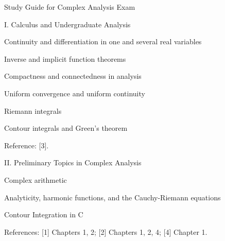 \documentclass[a4paper,portrait,12pt]{article}
\begin{document}
\begin{flushleft}
Study Guide for Complex Analysis Exam
\end{flushleft}


\begin{flushleft}
I. Calculus and Undergraduate Analysis
\end{flushleft}


\begin{flushleft}
Continuity and differentiation in one and several real variables
\end{flushleft}


\begin{flushleft}
Inverse and implicit function theorems
\end{flushleft}


\begin{flushleft}
Compactness and connectedness in analysis
\end{flushleft}


\begin{flushleft}
Uniform convergence and uniform continuity
\end{flushleft}


\begin{flushleft}
Riemann integrals
\end{flushleft}


\begin{flushleft}
Contour integrals and Green's theorem
\end{flushleft}


\begin{flushleft}
Reference: [3].
\end{flushleft}


\begin{flushleft}
II. Preliminary Topics in Complex Analysis
\end{flushleft}


\begin{flushleft}
Complex arithmetic
\end{flushleft}


\begin{flushleft}
Analyticity, harmonic functions, and the Cauchy-Riemann equations
\end{flushleft}


\begin{flushleft}
Contour Integration in C
\end{flushleft}


\begin{flushleft}
References: [1] Chapters 1, 2; [2] Chapters 1, 2, 4; [4] Chapter 1.
\end{flushleft}
\end{document}
